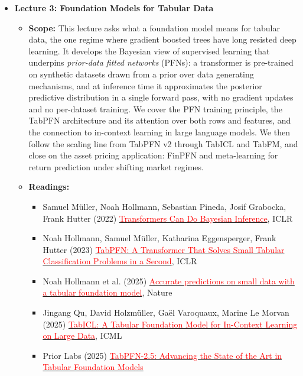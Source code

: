 \documentclass[11pt]{article}
\begin{document}
\begin{itemize}
\item \textbf{Lecture 3: Foundation Models for Tabular Data}
  \begin{itemize}
    \item \textbf{Scope:} This lecture asks what a foundation model means for tabular
      data, the one regime where gradient boosted trees have long resisted deep
      learning. It develops the Bayesian view of supervised learning that underpins
      \textit{prior-data fitted networks} (PFNs): a transformer is pre-trained on
      synthetic datasets drawn from a prior over data generating mechanisms, and at
      inference time it approximates the posterior predictive distribution in a
      single forward pass, with no gradient updates and no per-dataset training. We
      cover the PFN training principle, the TabPFN architecture and its attention
      over both rows and features, and the connection to in-context learning in
      large language models. We then follow the scaling line from TabPFN v2 through
      TabICL and TabFM, and close on the asset pricing application: FinPFN and
      meta-learning for return prediction under shifting market regimes.
    \item \textbf{Readings:}
      \begin{itemize}
        \item Samuel M\"uller, Noah Hollmann, Sebastian Pineda, Josif Grabocka, Frank Hutter (2022) \href{https://arxiv.org/abs/2112.10510}{\textcolor{red}{Transformers Can Do Bayesian Inference}}, ICLR
        \item Noah Hollmann, Samuel M\"uller, Katharina Eggensperger, Frank Hutter (2023) \href{https://arxiv.org/abs/2207.01848}{\textcolor{red}{TabPFN: A Transformer That Solves Small Tabular Classification Problems in a Second}}, ICLR
        \item Noah Hollmann et al. (2025) \href{https://www.nature.com/articles/s41586-024-08328-6}{\textcolor{red}{Accurate predictions on small data with a tabular foundation model}}, Nature
        \item Jingang Qu, David Holzm\"uller, Ga\"el Varoquaux, Marine Le Morvan (2025) \href{https://arxiv.org/abs/2502.05564}{\textcolor{red}{TabICL: A Tabular Foundation Model for In-Context Learning on Large Data}}, ICML
        \item Prior Labs (2025) \href{https://arxiv.org/abs/2511.08667}{\textcolor{red}{TabPFN-2.5: Advancing the State of the Art in Tabular Foundation Models}}

\end{itemize}
\end{itemize}
\end{itemize}
\end{document}
